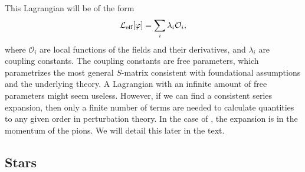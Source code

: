 This Lagrangian will be of the form
\begin{equation}
    \mathcal{L}_\text{eff}[\varphi] = \sum_i \lambda_i \mathcal O_i,
\end{equation}
where $\mathcal O_i$ are local functions of the fields and their derivatives, and $\lambda_i$ are coupling constants.
The coupling constants are free parameters, which parametrizes the most general $S$-matrix consistent with foundational assumptions and the underlying theory.
A Lagrangian with an infinite amount of free parameters might seem useless.
However, if we can find a consistent series expansion, then only a finite number of terms are needed to calculate quantities to any given order in perturbation theory.
In the case of \chpt, the expansion is in the momentum of the pions.
We will detail this later in the text.


\subsection*{Stars}

